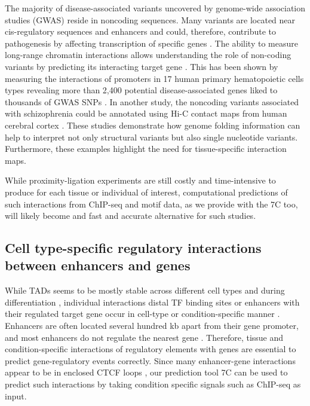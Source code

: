 \documentclass[a4paper,twoside=true,openright,parskip=full,chapterprefix=true,11pt,headings=normal,bibliography=totoc,listof=totoc,titlepage=on,captions=tableabove,draft=false]{scrreprt}
\theoremstyle{definition}
\theoremstyle{definition}
\theoremstyle{definition}
\theoremstyle{remark}
\begin{document}
The majority of disease-associated variants uncovered by genome-wide
association studies (GWAS) reside in noncoding sequences. Many variants
are located near cis-regulatory sequences and enhancers and could,
therefore, contribute to pathogenesis by affecting transcription of
specific genes \citep{Hindorff2009}. The ability to measure long-range
chromatin interactions allows understanding the role of non-coding
variants by predicting its interacting target gene
\citep{Smemo2014, Visser2012}. This has been shown by measuring the
interactions of promoters in 17 human primary hematopoietic cells types
revealing more than 2,400 potential disease-associated genes liked to
thousands of GWAS SNPs \citep{Javierre2016}. In another study, the
noncoding variants associated with schizophrenia could be annotated
using Hi-C contact maps from human cerebral cortex \citep{Won2016}.
These studies demonstrate how genome folding information can help to
interpret not only structural variants but also single nucleotide
variants. Furthermore, these examples highlight the need for
tissue-specific interaction maps.

While proximity-ligation experiments are still costly and time-intensive
to produce for each tissue or individual of interest, computational
predictions of such interactions from ChIP-seq and motif data, as we
provide with the 7C too, will likely become and fast and accurate
alternative for such studies.

\hypertarget{cell-type-specific-regulatory-interactions-between-enhancers-and-genes}{%
\subsection{Cell type-specific regulatory interactions between enhancers
and
genes}\label{cell-type-specific-regulatory-interactions-between-enhancers-and-genes}}

While TADs seems to be mostly stable across different cell types
\citep{Dixon2012} and during differentiation \citep{Dixon2015},
individual interactions distal TF binding sites or enhancers with their
regulated target gene occur in cell-type or condition-specific manner
\citep{Bonev2016, Andrey2017}. Enhancers are often located several
hundred kb apart from their gene promoter, and most enhancers do not
regulate the nearest gene \citep{Sanyal2012}. Therefore, tissue and
condition-specific interactions of regulatory elements with genes are
essential to predict gene-regulatory events correctly. Since many
enhancer-gene interactions appear to be in enclosed CTCF loops
\citep{Hnisz2016a}, our prediction tool 7C can be used to predict such
interactions by taking condition specific signals such as ChIP-seq as
input.
\end{document}
